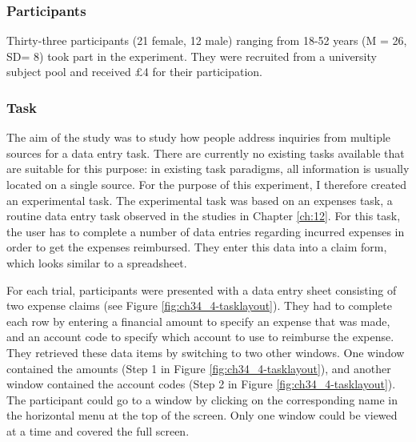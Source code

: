 \subsubsection{Participants}
Thirty-three participants (21 female, 12 male) ranging from 18-52 years (M = 26, SD= 8) took part in the experiment. They were recruited from a university subject pool and received $\pounds$4 for their participation.

\subsubsection{Task}
The aim of the study was to study how people address inquiries from multiple sources for a data entry task. There are currently no existing tasks available that are suitable for this purpose: in existing task paradigms, all information is usually located on a single source. For the purpose of this experiment, I therefore created an experimental task. The experimental task was based on an expenses task, a routine data entry task observed in the studies in Chapter \ref{ch:12}. For this task, the user has to complete a number of data entries regarding incurred expenses in order to get the expenses reimbursed. They enter this data into a claim form, which looks similar to a spreadsheet. 

For each trial, participants were presented with a data entry sheet consisting of two expense claims (see Figure \ref{fig:ch34_4-tasklayout}). They had to complete each row by entering a financial amount to specify an expense that was made, and an account code to specify which account to use to reimburse the expense. They retrieved these data items by switching to two other windows. One window contained the amounts (Step 1 in Figure \ref{fig:ch34_4-tasklayout}), and another window contained the account codes (Step 2 in Figure \ref{fig:ch34_4-tasklayout}). The participant could go to a window by clicking on the corresponding name in the horizontal menu at the top of the screen. Only one window could be viewed at a time and covered the full screen. 

